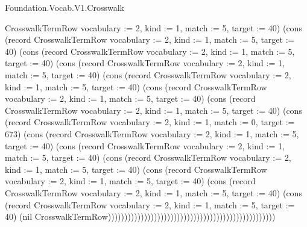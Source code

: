 \begin{lexlean}{Foundation.Vocab.V1.Crosswalk}
\begin{semanticmodule}
{CrosswalkTermRow {vocabulary := 2, kind := 1, match := 5, target := 40}) (cons (record CrosswalkTermRow {vocabulary := 2, kind := 1, match := 5, target := 40}) (cons (record CrosswalkTermRow {vocabulary := 2, kind := 1, match := 5, target := 40}) (cons (record CrosswalkTermRow {vocabulary := 2, kind := 1, match := 5, target := 40}) (cons (record CrosswalkTermRow {vocabulary := 2, kind := 1, match := 5, target := 40}) (cons (record CrosswalkTermRow {vocabulary := 2, kind := 1, match := 5, target := 40}) (cons (record CrosswalkTermRow {vocabulary := 2, kind := 1, match := 5, target := 40}) (cons (record CrosswalkTermRow {vocabulary := 2, kind := 1, match := 0, target := 673}) (cons (record CrosswalkTermRow {vocabulary := 2, kind := 1, match := 5, target := 40}) (cons (record CrosswalkTermRow {vocabulary := 2, kind := 1, match := 5, target := 40}) (cons (record CrosswalkTermRow {vocabulary := 2, kind := 1, match := 5, target := 40}) (cons (record CrosswalkTermRow {vocabulary := 2, kind := 1, match := 5, target := 40}) (cons (record CrosswalkTermRow {vocabulary := 2, kind := 1, match := 5, target := 40}) (cons (record CrosswalkTermRow {vocabulary := 2, kind := 1, match := 5, target := 40}) (nil CrosswalkTermRow)))))))))))))))))))))))))))))))))))))))))))))))))))
}


\end{semanticmodule}
\end{lexlean}
